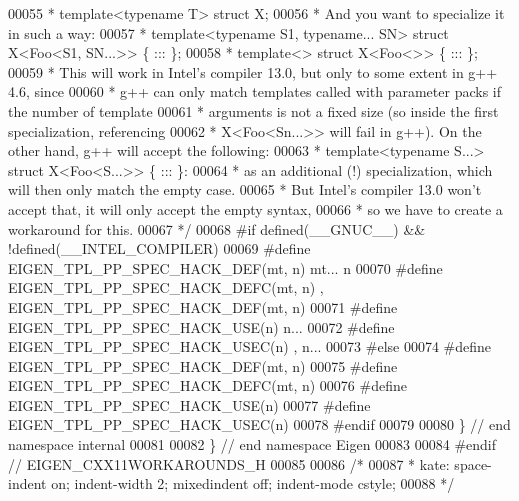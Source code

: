\begin{DoxyCode}
00055 \textcolor{comment}{ * template<typename T> struct X;}
00056 \textcolor{comment}{ * And you want to specialize it in such a way:}
00057 \textcolor{comment}{ *    template<typename S1, typename... SN> struct X<Foo<S1, SN...>> \{ ::: \};}
00058 \textcolor{comment}{ *    template<>                            struct X<Foo<>>          \{ ::: \};}
00059 \textcolor{comment}{ * This will work in Intel's compiler 13.0, but only to some extent in g++ 4.6, since}
00060 \textcolor{comment}{ * g++ can only match templates called with parameter packs if the number of template}
00061 \textcolor{comment}{ * arguments is not a fixed size (so inside the first specialization, referencing}
00062 \textcolor{comment}{ * X<Foo<Sn...>> will fail in g++). On the other hand, g++ will accept the following:}
00063 \textcolor{comment}{ *    template<typename S...> struct X<Foo<S...>> \{ ::: \}:}
00064 \textcolor{comment}{ * as an additional (!) specialization, which will then only match the empty case.}
00065 \textcolor{comment}{ * But Intel's compiler 13.0 won't accept that, it will only accept the empty syntax,}
00066 \textcolor{comment}{ * so we have to create a workaround for this.}
00067 \textcolor{comment}{ */}
00068 \textcolor{preprocessor}{#if defined(\_\_GNUC\_\_) && !defined(\_\_INTEL\_COMPILER)}
00069 \textcolor{preprocessor}{#define EIGEN\_TPL\_PP\_SPEC\_HACK\_DEF(mt, n)    mt... n}
00070 \textcolor{preprocessor}{#define EIGEN\_TPL\_PP\_SPEC\_HACK\_DEFC(mt, n)   , EIGEN\_TPL\_PP\_SPEC\_HACK\_DEF(mt, n)}
00071 \textcolor{preprocessor}{#define EIGEN\_TPL\_PP\_SPEC\_HACK\_USE(n)        n...}
00072 \textcolor{preprocessor}{#define EIGEN\_TPL\_PP\_SPEC\_HACK\_USEC(n)       , n...}
00073 \textcolor{preprocessor}{#else}
00074 \textcolor{preprocessor}{#define EIGEN\_TPL\_PP\_SPEC\_HACK\_DEF(mt, n)}
00075 \textcolor{preprocessor}{#define EIGEN\_TPL\_PP\_SPEC\_HACK\_DEFC(mt, n)}
00076 \textcolor{preprocessor}{#define EIGEN\_TPL\_PP\_SPEC\_HACK\_USE(n)}
00077 \textcolor{preprocessor}{#define EIGEN\_TPL\_PP\_SPEC\_HACK\_USEC(n)}
00078 \textcolor{preprocessor}{#endif}
00079 
00080 \} \textcolor{comment}{// end namespace internal}
00081 
00082 \} \textcolor{comment}{// end namespace Eigen}
00083 
00084 \textcolor{preprocessor}{#endif // EIGEN\_CXX11WORKAROUNDS\_H}
00085 
00086 \textcolor{comment}{/*}
00087 \textcolor{comment}{ * kate: space-indent on; indent-width 2; mixedindent off; indent-mode cstyle;}
00088 \textcolor{comment}{ */}
\end{DoxyCode}

